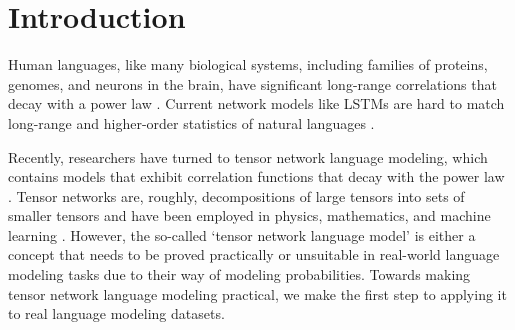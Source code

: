 \section{Introduction}



Human languages, like many biological systems, including families of proteins, genomes, and neurons in the brain, have significant long-range correlations that decay with a power law \citep{tagliazucchi2012criticality, mora2011biological}.  
Current network models like LSTMs \cite{hochreiter1997long} are hard to match long-range and higher-order statistics of natural languages \citep{lin2016critical}. 


Recently, researchers have turned to tensor network language modeling,  which contains models that exhibit correlation functions that decay with the power law \citep{pestun2017tensor,pestun2017language,miller2021tensor}. Tensor networks are, roughly, decompositions of large tensors into sets of smaller tensors and have been employed in physics, mathematics, and machine learning \citep{cohen2016expressive}. However, the so-called `tensor network language model' is either a concept that needs to be proved practically \cite{pestun2017tensor} or unsuitable in real-world language modeling tasks \citep{miller2021tensor} due to their way of modeling probabilities.  Towards making tensor network language modeling practical, we make the first step to applying it to real language modeling datasets.

